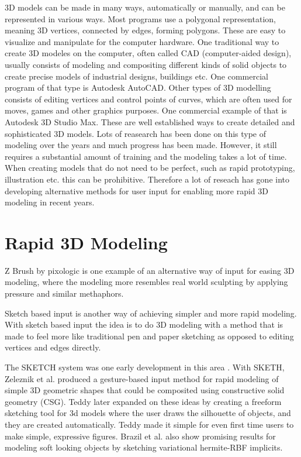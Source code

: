 \documentclass[a4paper,12pt]{report}
\begin{document}
3D models can be made in many ways, automatically or manually, and can be represented in various ways. Most programs use a polygonal representation, meaning 3D vertices, connected by edges, forming polygons. These are easy to visualize and manipulate for the computer hardware. One traditional way to create 3D modeles on the computer, often called CAD (computer-aided design),	 usually consists of modeling and compositing different kinds of solid objects to create precise models of industrial designs, buildings etc. One commercial program of that type is Autodesk AutoCAD. Other types of 3D modelling consists of editing vertices and control points of curves, which are often used for moves, games and other graphics purposes. One commercial example of that is Autodesk 3D Studio Max. These are well established ways to create detailed and sophisticated 3D models. Lots of reasearch has been done on this type of modeling over the years and much progress has been made. However, it still requires a substantial amount of training and the modeling takes a lot of time. When creating models that do not need to be perfect, such as rapid prototyping, illustration etc. this can be prohibitive. Therefore a lot of reseach has gone into developing alternative methods for user input for enabling more rapid 3D modeling in recent years.

\section{Rapid 3D Modeling}
 Z Brush by pixologic is one example of an alternative way of input for easing 3D modeling, where the modeling more resembles real world sculpting by applying pressure and similar methaphors. 
 
 Sketch based input is another way of achieving simpler and more rapid modeling. With sketch based input the idea is to do 3D modeling with a method that is made to feel more like traditional pen and paper sketching as opposed to editing vertices and edges directly.

The SKETCH system was one early development in this area \cite{zeleznik2007sketch}. With SKETH, Zeleznik et al. produced a gesture-based input method for rapid modeling of simple 3D geometric shapes that could be composited using constructive solid geometry (CSG). Teddy \cite{Igarashi:1999:TSI:311535.311602} later expanded on these ideas by creating a freeform sketching tool for 3d models where the user draws the silhouette of objects, and they are created automatically. Teddy made it simple for even first time users to make simple, expressive figures. Brazil et al. \cite{brazil2010sketching} also show promising results for modeling soft looking objects by sketching variational hermite-RBF implicits.
\end{document}
